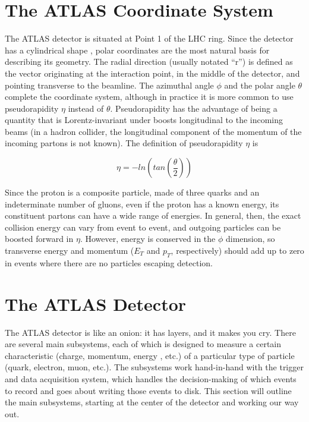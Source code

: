 \section{The ATLAS Coordinate System}
The ATLAS detector is situated at Point 1 of the LHC ring.  Since the detector has a cylindrical shape
, polar coordinates are the most natural basis for describing its geometry.  The radial direction (usually notated ``r'') 
is defined as the vector originating at the interaction point, in the middle of the detector, and pointing 
transverse to the beamline.  The azimuthal angle $\phi$ and the polar angle $\theta$ complete the 
coordinate system, although in practice it is more common to use pseudorapidity $\eta$ instead of $\theta$.  
Pseudorapidity has the advantage of being a quantity that is Lorentz-invariant under boosts longitudinal to the incoming beams 
(in a hadron collider, the longitudinal component of the momentum of the incoming partons is not known).  
The definition of pseudorapidity $\eta$ is

\begin{equation}
\eta = -ln(tan( \frac{\theta}{2} ))
\end{equation}

Since the proton is a composite particle, made of three quarks and an indeterminate number of gluons, even 
if the proton has a known energy, its constituent partons can have a wide range of energies.  In 
general, then, the exact collision energy can vary from event to event, and outgoing particles can be 
boosted forward in $\eta$.  However, energy is conserved in the $\phi$ dimension, so transverse 
energy and momentum ($E_T$ and $p_T$, respectively) should add up to zero in events where there are no particles escaping detection.

\section{The ATLAS Detector}
The ATLAS detector is like an onion: it has layers, and it makes you cry.  There are 
several main subsystems, each of which is designed to measure a certain characteristic (charge, momentum, energy
, etc.) of a particular type of particle (quark, electron, muon, etc.).  The subsystems 
work hand-in-hand with the trigger and data acquisition system, which handles the decision-making 
of which events to record and goes about writing those events to disk.  This section will outline the main 
subsystems, starting at the center of the detector and working our way out.

